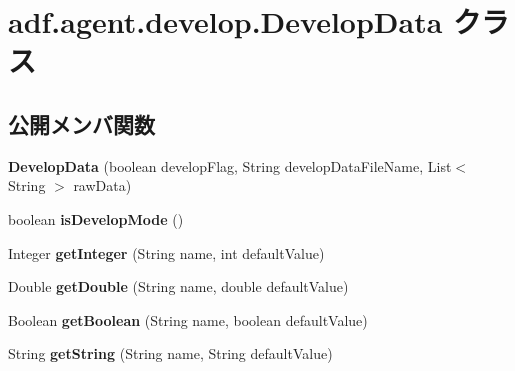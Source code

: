 \hypertarget{classadf_1_1agent_1_1develop_1_1DevelopData}{}\section{adf.\+agent.\+develop.\+Develop\+Data クラス}
\label{classadf_1_1agent_1_1develop_1_1DevelopData}
\subsection*{公開メンバ関数}
\begin{DoxyCompactItemize}
\item 
\hypertarget{classadf_1_1agent_1_1develop_1_1DevelopData_aef4cf489592feb7ff0a5947dbf7329cc}{}\label{classadf_1_1agent_1_1develop_1_1DevelopData_aef4cf489592feb7ff0a5947dbf7329cc} 
{\bfseries Develop\+Data} (boolean develop\+Flag, String develop\+Data\+File\+Name, List$<$ String $>$ raw\+Data)
\item 
\hypertarget{classadf_1_1agent_1_1develop_1_1DevelopData_aa504c579f983433f4b83b911e5808f2b}{}\label{classadf_1_1agent_1_1develop_1_1DevelopData_aa504c579f983433f4b83b911e5808f2b} 
boolean {\bfseries is\+Develop\+Mode} ()
\item 
\hypertarget{classadf_1_1agent_1_1develop_1_1DevelopData_af55569be14e228d98738d15d0214d0ad}{}\label{classadf_1_1agent_1_1develop_1_1DevelopData_af55569be14e228d98738d15d0214d0ad} 
Integer {\bfseries get\+Integer} (String name, int default\+Value)
\item 
\hypertarget{classadf_1_1agent_1_1develop_1_1DevelopData_a185a4a55199c5199943e6e18bc173d07}{}\label{classadf_1_1agent_1_1develop_1_1DevelopData_a185a4a55199c5199943e6e18bc173d07} 
Double {\bfseries get\+Double} (String name, double default\+Value)
\item 
\hypertarget{classadf_1_1agent_1_1develop_1_1DevelopData_a543879df41f6ac2c40406271d6f724ab}{}\label{classadf_1_1agent_1_1develop_1_1DevelopData_a543879df41f6ac2c40406271d6f724ab} 
Boolean {\bfseries get\+Boolean} (String name, boolean default\+Value)
\item 
\hypertarget{classadf_1_1agent_1_1develop_1_1DevelopData_a7cedf349b54c1337d6ae36eea73f3753}{}\label{classadf_1_1agent_1_1develop_1_1DevelopData_a7cedf349b54c1337d6ae36eea73f3753} 
String {\bfseries get\+String} (String name, String default\+Value)
\item 
\hypertarget{classadf_1_1agent_1_1develop_1_1DevelopData_a8b53099cdeed50c7a27c741851e1e459}{}\label{classadf_1_1agent_1_1develop_1_1DevelopData_a8b53099cdeed50c7a27c741851e1e459} 

\end{DoxyCompactItemize}
